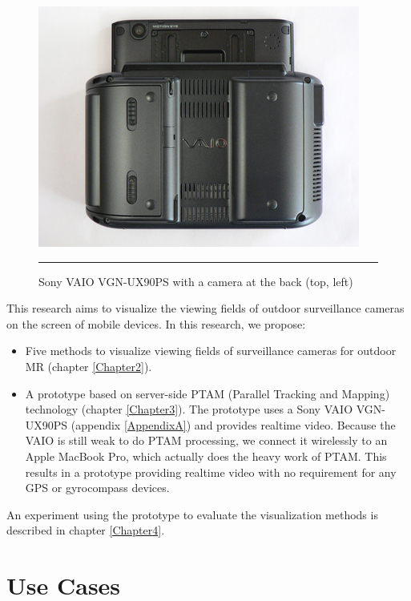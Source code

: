\begin{figure}[htbp]
	\centering
	\includegraphics{./Primitives/vaio_back.jpg}
	\rule{35em}{0.5pt}
	\caption[Sony VAIO VGN-UX90PS with a camera at the back]{Sony VAIO VGN-UX90PS with a camera at the back (top, left)}
	\label{fig:VAIOBack}
\end{figure}

This research aims to visualize the viewing fields of outdoor surveillance cameras on the screen of mobile devices. In this research, we propose:

\begin{itemize}
	\item Five methods to visualize viewing fields of surveillance cameras for outdoor MR (chapter \ref{Chapter2}).
	\item A prototype based on server-side PTAM (Parallel Tracking and Mapping) \cite{Reference12} technology (chapter \ref{Chapter3}). The prototype uses a Sony VAIO VGN-UX90PS (appendix \ref{AppendixA}) and provides realtime video. Because the VAIO is still weak to do PTAM processing, we connect it wirelessly to an Apple MacBook Pro, which actually does the heavy work of PTAM. This results in a prototype providing realtime video with no requirement for any GPS or gyrocompass devices.
\end{itemize}

An experiment using the prototype to evaluate the visualization methods is described in chapter \ref{Chapter4}.


\section{Use Cases}
\label{UseCases}

